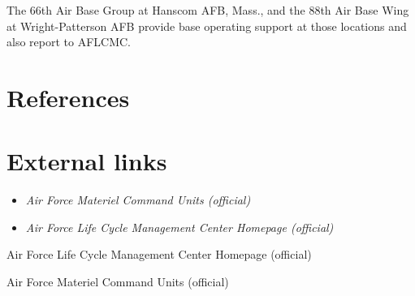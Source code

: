 The 66th Air Base Group at Hanscom AFB, Mass., and the 88th Air Base
Wing at Wright-Patterson AFB provide base operating support at those
locations and also report to AFLCMC.

\section{References}\label{references}

\section{External links}\label{external-links}

\begin{itemize}
\item
  \emph{Air Force Materiel Command Units (official)}
\item
  \emph{Air Force Life Cycle Management Center Homepage (official)}
\end{itemize}

Air Force Life Cycle Management Center Homepage (official)

Air Force Materiel Command Units (official)
